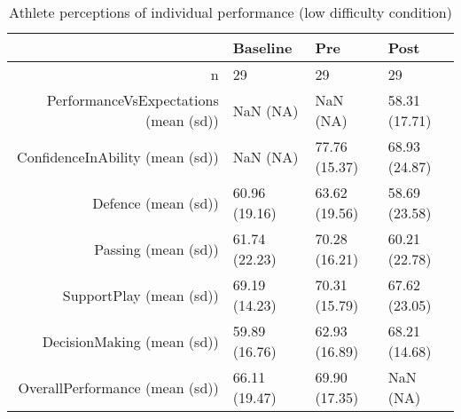 \begin{table}[ht]
\centering
\begin{tabular}{rlll}
  \hline
 & Baseline & Pre & Post \\ 
  \hline
n &    29 &    29 &    29 \\ 
  PerformanceVsExpectations (mean (sd)) &   NaN (NA) &   NaN (NA) & 58.31 (17.71) \\ 
  ConfidenceInAbility (mean (sd)) &   NaN (NA) & 77.76 (15.37) & 68.93 (24.87) \\ 
  Defence (mean (sd)) & 60.96 (19.16) & 63.62 (19.56) & 58.69 (23.58) \\ 
  Passing (mean (sd)) & 61.74 (22.23) & 70.28 (16.21) & 60.21 (22.78) \\ 
  SupportPlay (mean (sd)) & 69.19 (14.23) & 70.31 (15.79) & 67.62 (23.05) \\ 
  DecisionMaking (mean (sd)) & 59.89 (16.76) & 62.93 (16.89) & 68.21 (14.68) \\ 
  OverallPerformance (mean (sd)) & 66.11 (19.47) & 69.90 (17.35) &   NaN (NA) \\ 
   \hline
\end{tabular}
\caption{Athlete perceptions of 
 individual performance (low difficulty condition)} 
\label{tab:indPerfTimeHighTraining}
\end{table}
